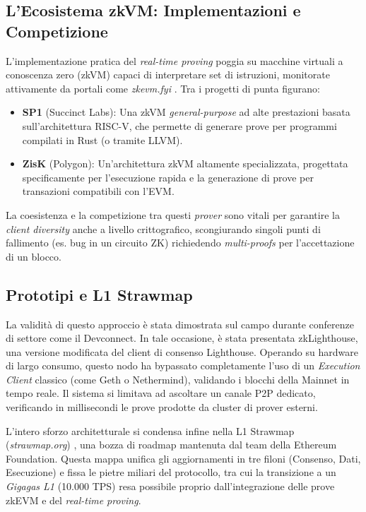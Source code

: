 \documentclass[12pt,a4paper,openright,twoside]{report}
\begin{document}
\subsection{L'Ecosistema zkVM: Implementazioni e Competizione}

L'implementazione pratica del \textit{real-time proving} poggia su macchine virtuali a conoscenza zero (zkVM) capaci di interpretare set di istruzioni, monitorate attivamente da portali come \textit{zkevm.fyi} \cite{zkevm_book}. Tra i progetti di punta figurano:
\begin{itemize}
    \item \textbf{SP1}\cite{sp1} (Succinct Labs): Una zkVM \textit{general-purpose} ad alte prestazioni basata sull'architettura RISC-V, che permette di generare prove per programmi compilati in Rust (o tramite LLVM).
    \item \textbf{ZisK}\cite{zisk} (Polygon): Un'architettura zkVM altamente specializzata, progettata specificamente per l'esecuzione rapida e la generazione di prove per transazioni compatibili con l'EVM.
\end{itemize}
La coesistenza e la competizione tra questi \textit{prover} sono vitali per garantire la \textit{client diversity} anche a livello crittografico, scongiurando singoli punti di fallimento (es. bug in un circuito ZK) richiedendo \textit{multi-proofs} per l'accettazione di un blocco.

\subsection{Prototipi e L1 Strawmap}

La validità di questo approccio è stata dimostrata sul campo durante conferenze di settore come il Devconnect. In tale occasione, è stata presentata zkLighthouse\cite{zkLighthouse_demo}, una versione modificata del client di consenso Lighthouse. Operando su hardware di largo consumo, questo nodo ha bypassato completamente l'uso di un \textit{Execution Client} classico (come Geth o Nethermind), validando i blocchi della Mainnet in tempo reale. Il sistema si limitava ad ascoltare un canale P2P dedicato, verificando in millisecondi le prove prodotte da cluster di prover esterni.

L'intero sforzo architetturale si condensa infine nella L1 Strawmap (\textit{strawmap.org}) \cite{strawmap}, una bozza di roadmap mantenuta dal team della Ethereum Foundation. Questa mappa unifica gli aggiornamenti in tre filoni (Consenso, Dati, Esecuzione) e fissa le pietre miliari del protocollo, tra cui la transizione a un \textit{Gigagas L1} (10.000 TPS) resa possibile proprio dall'integrazione delle prove zkEVM e del \textit{real-time proving}.
\end{document}
